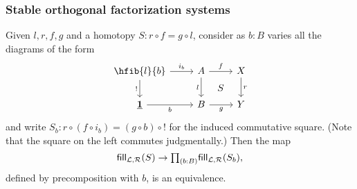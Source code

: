 \subsubsection{Stable orthogonal factorization systems}

\begin{lem}\label{lem:fill_compute}
Given $l,r,f,g$ and a homotopy $S : r \circ f = g  \circ l$, consider as $b:B$ varies all the diagrams of the form
\begin{equation*}
\begin{tikzcd}
\hfib{l}{b} \arrow[r,"i_b"] \arrow[d,"!"'] & A \arrow[d,swap,"l"] \arrow[r,"f"] \ar[dr,phantom,"S"] & X \arrow[d,"r"] \\
\unit \arrow[r,swap,"b"] & B \arrow[r,swap,"g"] & Y
\end{tikzcd}
\end{equation*}
and write $S_b : r \circ (f \circ i_b) = (g\circ b) \circ \mathord !$ for the induced commutative square.
(Note that the square on the left commutes judgmentally.)
Then the map
\begin{equation*}
\fillers{S} \to \prd{b:B}\fillers{S_b},
\end{equation*}
defined by precomposition with $b$, is an equivalence.
\end{lem}

